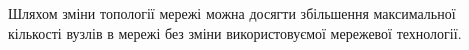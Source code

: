 \documentclass[a4paper,ukrainian,utf8,nocolumnsxix,floatsection,equationsection]{eskdtext}
\begin{document}
Шляхом зміни топології мережі можна досягти збільшення максимальної кількості вузлів в мережі без зміни використовуємої мережевої технології.

\begin{figure}[htb]
	\centering
	\qquad
\end{figure}
\end{document}
